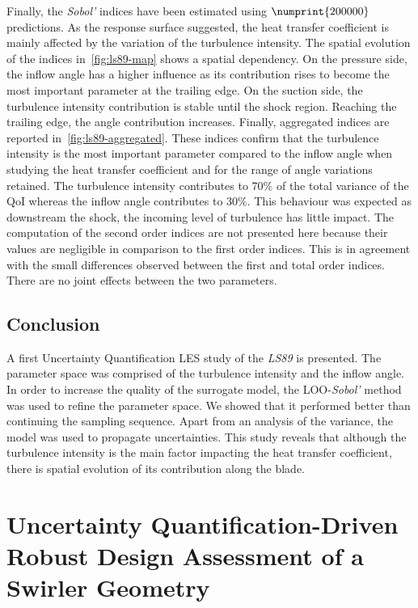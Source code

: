 Finally, the \textit{Sobol'} indices have been estimated using $\numprint{200000}$ predictions. As the response surface suggested, the heat transfer coefficient is mainly affected by the variation of the turbulence intensity. The spatial evolution of the indices in~\cref{fig:ls89-map} shows a spatial dependency. On the pressure side, the inflow angle has a higher influence as its contribution rises to become the most important parameter at the trailing edge. On the suction side, the turbulence intensity contribution is stable until the shock region. Reaching the trailing edge, the angle contribution increases. Finally, aggregated indices are reported in~\cref{fig:ls89-aggregated}. These indices confirm that the turbulence intensity is the most important parameter compared to the inflow angle when studying the heat transfer coefficient and for the range of angle variations retained. The turbulence intensity contributes to 70\% of the total variance of the QoI whereas the inflow angle contributes to 30\%. This behaviour was expected as downstream the shock, the incoming level of turbulence has little impact. The computation of the second order indices are not presented here because their values are negligible in comparison to the first order indices. This is in agreement with the small differences observed between the first and total order indices. There are no joint effects between the two parameters.


\section{Conclusion}\label{sec:ls89_ccl}

A first Uncertainty Quantification LES study of the \textit{LS89} is presented. The parameter space was comprised of the turbulence intensity and the inflow angle. In order to increase the quality of the surrogate model, the LOO-\textit{Sobol'} method was used to refine the parameter space. We showed that it performed better than continuing the sampling sequence. Apart from an analysis of the variance, the model was used to propagate uncertainties. This study reveals that although the turbulence intensity is the main factor impacting the heat transfer coefficient, there is spatial evolution of its contribution along the blade.


\chapter{Uncertainty Quantification-Driven Robust Design Assessment of a Swirler Geometry}\label{chap:swirler}

